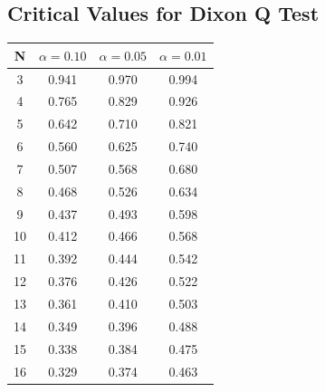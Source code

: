 \documentclass[a4paper,12pt]{article}
\begin{document}
\newpage
\subsection*{Critical Values for Dixon Q Test}
{
	\Large
	\begin{center}
		\begin{tabular}{|c|c|c|c|}
			\hline  N  & $\alpha=0.10$  & $\alpha=0.05$  & $\alpha=0.01$  \\ \hline
			3  & 0.941 & 0.970 & 0.994 \\ \hline
			4  & 0.765 & 0.829 & 0.926 \\ \hline
			5  & 0.642 & 0.710  & 0.821 \\ \hline
			6  & 0.560 & 0.625 & 0.740 \\ \hline
			7  & 0.507 & 0.568 & 0.680  \\ \hline
			8  & 0.468 & 0.526 & 0.634 \\ \hline
			9  & 0.437 & 0.493 & 0.598 \\ \hline
			10 & 0.412 & 0.466 & 0.568 \\ \hline
			11 & 0.392 & 0.444 & 0.542 \\ \hline
			12 & 0.376 & 0.426 & 0.522 \\ \hline
			13 & 0.361 & 0.410 & 0.503 \\ \hline
			14 & 0.349 & 0.396 & 0.488 \\ \hline
			15 & 0.338 & 0.384 & 0.475 \\ \hline
			16 & 0.329 & 0.374 & 0.463 \\ \hline
		\end{tabular} 
	\end{center}
}
\end{document}
